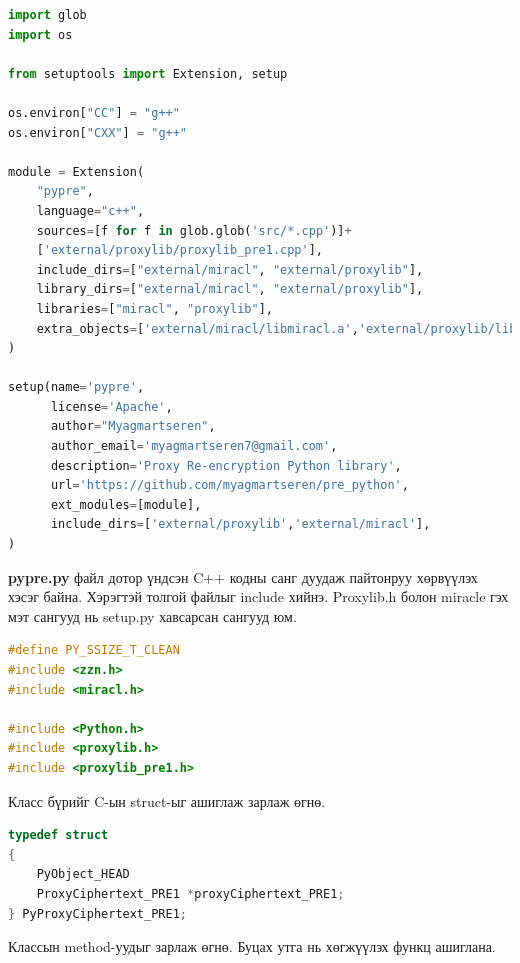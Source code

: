 \begin{lstlisting}[language=Python, caption={setup.py}, captionpos=b]
import glob
import os

from setuptools import Extension, setup

os.environ["CC"] = "g++"
os.environ["CXX"] = "g++"

module = Extension(
    "pypre",
    language="c++",
    sources=[f for f in glob.glob('src/*.cpp')]+
    ['external/proxylib/proxylib_pre1.cpp'],
    include_dirs=["external/miracl", "external/proxylib"],
    library_dirs=["external/miracl", "external/proxylib"],
    libraries=["miracl", "proxylib"],
    extra_objects=['external/miracl/libmiracl.a','external/proxylib/libproxylib.a']
)

setup(name='pypre',
      license='Apache',
      author="Myagmartseren",
      author_email='myagmartseren7@gmail.com',
      description='Proxy Re-encryption Python library',
      url='https://github.com/myagmartseren/pre_python',
      ext_modules=[module],
      include_dirs=['external/proxylib','external/miracl'],
)
\end{lstlisting}

\textbf{pypre.py} файл дотор үндсэн C++ кодны санг дуудаж пайтонруу хөрвүүлэх хэсэг байна.
Хэрэгтэй толгой файлыг include хийнэ. Proxylib.h болон miracle гэх мэт сангууд нь setup.py хавсарсан сангууд юм.

\begin{lstlisting}[language=C, caption={setup.py}, captionpos=b]
#define PY_SSIZE_T_CLEAN
#include <zzn.h>
#include <miracl.h>

#include <Python.h>
#include <proxylib.h>
#include <proxylib_pre1.h>    
\end{lstlisting}

\noindent Класс бүрийг C-ын struct-ыг ашиглаж зарлаж өгнө.

\begin{lstlisting}[language=C, caption={setup.py}]
typedef struct
{
    PyObject_HEAD
    ProxyCiphertext_PRE1 *proxyCiphertext_PRE1;
} PyProxyCiphertext_PRE1;
\end{lstlisting}

\noindent Классын method-уудыг зарлаж өгнө. Буцах утга нь хөгжүүлэх функц ашиглана.

